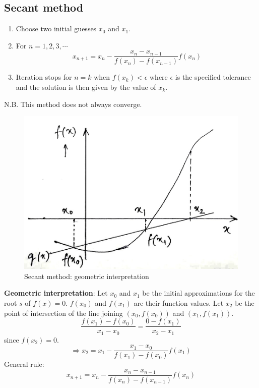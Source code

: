 \documentclass[a4paper,11pt]{book}
\begin{document}
\subsection{Secant method}
\begin{enumerate}
    \item Choose two initial guesses $x_0$ and $x_1$.
    \item For $n = 1,2,3, \cdots $
    $$x_{n+1} = x_n - \dfrac{x_n-x_{n-1}}{f(x_n)-f(x_{n-1})}f(x_n)$$
    \item Iteration stops for $n=k$ when $f(x_k) < \epsilon$ where $\epsilon$ is the specified tolerance and the solution is then given by the value of $x_k$.
\end{enumerate}
\noindent N.B. This method does not always converge.
\vspace{5mm}

\begin{figure}[ht]
	\centering
	\includegraphics[scale=0.2]{code/sort/pic/secant.jpeg}
	\caption{Secant method: geometric interpretation}
\end{figure}
\noindent \textbf{Geometric interpretation}: Let $x_0$ and $x_1$ be the initial approximations for the root $s$ of $f(x)=0$. $f(x_0)$ and $f(x_1)$ are their function values. Let $x_2$ be the point of intersection of the line joining $\left(x_0, f(x_0)\right)$ and $\left(x_1, f(x_1)\right)$.
$$\dfrac{f(x_1)-f(x_0)}{x_1-x_0} = \dfrac{0-f(x_1)}{x_2-x_1}$$
\noindent since $f(x_2)=0$.
$$\Rightarrow x_2 = x_1 - \dfrac{x_1-x_0}{f(x_1)-f(x_0)}f(x_1)$$
\noindent General rule:
$$x_{n+1} = x_n - \dfrac{x_n-x_{n-1}}{f(x_n)-f(x_{n-1})}f(x_n)$$
\end{document}
